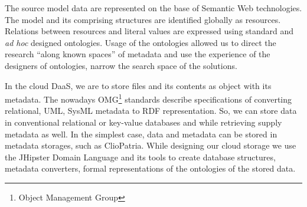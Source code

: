 \documentclass[a4paper]{jpconf}
\begin{document}
The source model data are represented on the base of Semantic Web technologies.  The model and its comprising structures are identified globally as resources.  Relations between resources and literal values are expressed using standard and \emph{ad hoc} designed ontologies.  Usage of the ontologies allowed us to direct the research ``along known spaces'' of metadata and use the experience of the designers of ontologies, narrow the search space of the solutions.


In the cloud DaaS, we are to store files and its contents as object with its metadata.  The nowadays OMG\footnote{Object Management Group} standards describe specifications of converting relational, UML, SysML metadata to RDF representation.  So, we can store data in conventional relational or key-value databases and while retrieving supply metadata as well.  In the simplest case, data and metadata can be stored in metadata storages, such as ClioPatria.  While designing our cloud storage we use the JHipster Domain Language \cite{jhipster} and its tools to create database structures, metadata converters, formal representations of the ontologies of the stored data.

\end{document}
